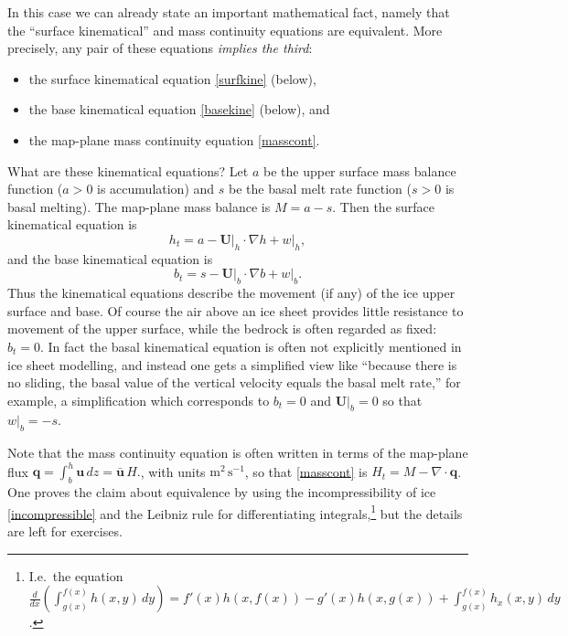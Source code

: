 \documentclass[titlepage,letterpaper,final,12pt]{scrartcl}
\newcommand{\bq}{\mathbf{q}}
\newcommand{\grad}{\nabla}
\newcommand{\Div}{\nabla\cdot}
\begin{document}
In this case we can already state an important mathematical fact, namely that the ``surface kinematical'' and mass continuity equations are equivalent.  More precisely, any pair of these equations \emph{implies the third}:
  \begin{itemize}
  \item the surface kinematical equation \eqref{surfkine} (below),
  \item the base kinematical equation \eqref{basekine} (below), and
  \item the map-plane mass continuity equation \eqref{masscont}.
  \end{itemize}

What are these kinematical equations?  Let $a$ be the upper surface mass balance function ($a>0$ is accumulation) and $s$ be the basal melt rate function ($s>0$ is basal melting).  The map-plane mass balance is $M=a-s$.  Then the surface kinematical equation is 
\begin{equation}
h_t = a - \mathbf{U}\big|_h \cdot \grad h + w\big|_h,  \label{surfkine}
\end{equation}
and the base kinematical equation is
\begin{equation}
b_t = s - \mathbf{U}\big|_b \cdot \grad b + w\big|_b.  \label{basekine}
\end{equation}
Thus the kinematical equations describe the movement (if any) of the ice upper surface and base.  Of course the air above an ice sheet provides little resistance to movement of the upper surface, while the bedrock is often regarded as fixed: $b_t=0$.  In fact the basal kinematical equation is often not explicitly mentioned in ice sheet modelling, and instead one gets a simplified view like ``because there is no sliding, the basal value of the vertical velocity equals the basal melt rate,'' for example, a simplification which corresponds to $b_t=0$ and $\mathbf{U}\big|_b=0$ so that $w\big|_b=-s$.

Note that the mass continuity equation is often written in terms of the map-plane flux $\bq = \int_{b}^{h} \mathbf{u}\,dz = \bar{\mathbf{u}}\,H.$, with units $\text{m}^2\,\text{s}^{-1}$, so that \eqref{masscont} is $H_t = M - \Div \bq$.  One proves the claim about equivalence by using the incompressibility of ice \eqref{incompressible} and  the Leibniz rule for differentiating integrals,\footnote{I.e.~the equation $\frac{d}{dx}\left(\int_{g(x)}^{f(x)} h(x,y)\,dy\right) = f'(x) h(x,f(x)) - g'(x) h(x,g(x)) + \int_{g(x)}^{f(x)} h_x(x,y)\,dy$.} but the details are left for exercises.
\end{document}
